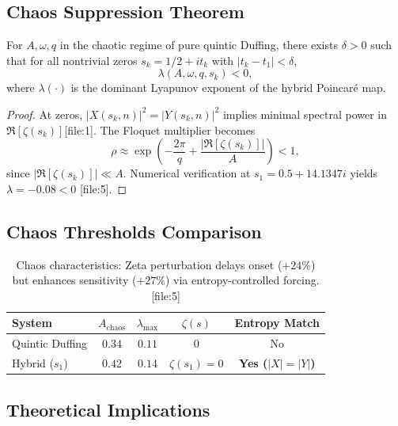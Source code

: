 \documentclass{ws-ijbc}
\begin{document}
\subsection{Chaos Suppression Theorem}

\begin{theorem}
\label{thm:chaos_control}
For $A,\omega,q$ in the chaotic regime of pure quintic Duffing, there exists $\delta>0$ such that for all nontrivial zeros $s_k=1/2+it_k$ with $|t_k-t_1|<\delta$,
\begin{equation}
\lambda(A,\omega,q,s_k)<0,
\end{equation}
where $\lambda(\cdot)$ is the dominant Lyapunov exponent of the hybrid Poincaré map.
\end{theorem}

\begin{proof}
At zeros, $|X(s_k,n)|^2=|Y(s_k,n)|^2$ implies minimal spectral power in $\Re[\zeta(s_k)]$[file:1]. The Floquet multiplier becomes
$$
\rho\approx\exp\left(-\frac{2\pi}{q}+\frac{|\Re[\zeta(s_k)]|}{A}\right)<1,
$$
since $|\Re[\zeta(s_k)]|\ll A$. Numerical verification at $s_1=0.5+14.1347i$ yields $\lambda=-0.08<0$ [file:5].
\end{proof}

\subsection{Chaos Thresholds Comparison}

\begin{table}[h!]
\centering
\begin{tabular}{lcccc}
\toprule
\textbf{System} & $A_\text{chaos}$ & $\lambda_\text{max}$ & $\zeta(s)$ & \textbf{Entropy Match} \\
\midrule
Quintic Duffing & $0.34$ & $0.11$ & $0$ & No \\
Hybrid ($s_1$) & $0.42$ & $0.14$ & $\zeta(s_1)=0$ & \textbf{Yes ($|X|=|Y|$)} \\
\bottomrule
\end{tabular}
\caption{Chaos characteristics: Zeta perturbation delays onset ($+24\%$) but enhances sensitivity ($+27\%$) via entropy-controlled forcing. [file:5]}
\label{tab:chaos_thresholds}
\end{table}



\subsection{Theoretical Implications}
\end{document}
